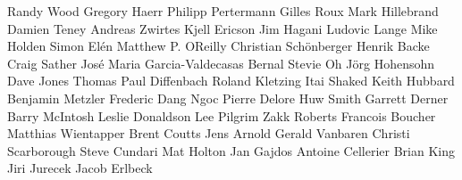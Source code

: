 \begin{center}
\begin{minipage}{16.15cm}
Randy Wood \newline
Gregory Haerr \newline
Philipp Pertermann \newline
Gilles Roux \newline
Mark Hillebrand \newline
Damien Teney \newline
Andreas Zwirtes \newline
Kjell Ericson \newline
Jim Hagani \newline
Ludovic Lange \newline
Mike Holden \newline
Simon El\'en \newline
Matthew P. OReilly \newline
Christian Sch\"onberger \newline
Henrik Backe \newline
Craig Sather \newline
Jos\'e Maria Garcia{}-Valdecasas Bernal\newline
Stevie Oh \newline
J\"org Hohensohn \newline
Dave Jones \newline
Thomas Paul Diffenbach \newline
Roland Kletzing \newline
Itai Shaked \newline
Keith Hubbard \newline
Benjamin Metzler \newline
Frederic Dang Ngoc \newline
Pierre Delore \newline
Huw Smith \newline
Garrett Derner \newline
Barry McIntosh \newline
Leslie Donaldson \newline
Lee Pilgrim \newline
Zakk Roberts \newline
Francois Boucher \newline
Matthias Wientapper \newline
Brent Coutts \newline
Jens Arnold \newline
Gerald Vanbaren \newline
Christi Scarborough \newline
Steve Cundari \newline
Mat Holton \newline
Jan Gajdos \newline
Antoine Cellerier \newline
Brian King \newline
Jiri Jurecek \newline
Jacob Erlbeck 
\end{minipage}\end{center}


